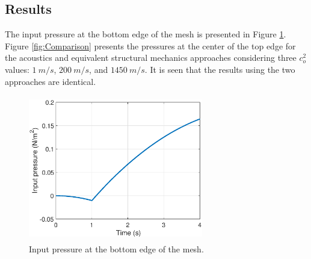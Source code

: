 \documentclass[3p]{elsarticle}
\begin{document}
\subsection{Results}

\noindent The input pressure at the bottom edge of the mesh is presented in Figure \ref{fig:Input}. Figure \ref{fig:Comparison} presents the pressures at the center of the top edge for the acoustics and equivalent structural mechanics approaches considering three $c_o^2$ values: $1~m/s$, $200~m/s$, and $1450~m/s$. It is seen that the results using the two approaches are identical. 

\begin{figure}[H]
\centering
\includegraphics[width=3in, height=2.5in]{Input.eps} 
\caption{Input pressure at the bottom edge of the mesh.}
\label{fig:Input}
\end{figure}
\end{document}
